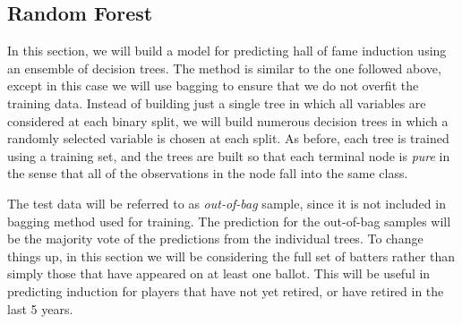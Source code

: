 \documentclass[preprint,12pt]{elsarticle}
\begin{document}




\subsection{Random Forest}
In this section, we will build a model for predicting hall of fame induction using an ensemble of decision trees. The method is similar to the one followed above, except in this case we will use bagging to ensure that we do not overfit the training data. Instead of building just a single tree in which all variables are considered at each binary split, we will build numerous decision trees in which a randomly selected variable is chosen at each split. As before, each tree is trained using a training set, and the trees are built so that each terminal node is \textit{pure} in the sense that all of the observations in the node fall into the same class.

The test data will be referred to as \textit{out-of-bag} sample, since it is not included in bagging method used for training. The prediction for the out-of-bag samples will be the majority vote of the predictions from the individual trees. To change things up, in this section we will be considering the full set of batters rather than simply those that have appeared on at least one ballot. This will be useful in predicting induction for players that have not yet retired, or have retired in the last 5 years.
\end{document}
